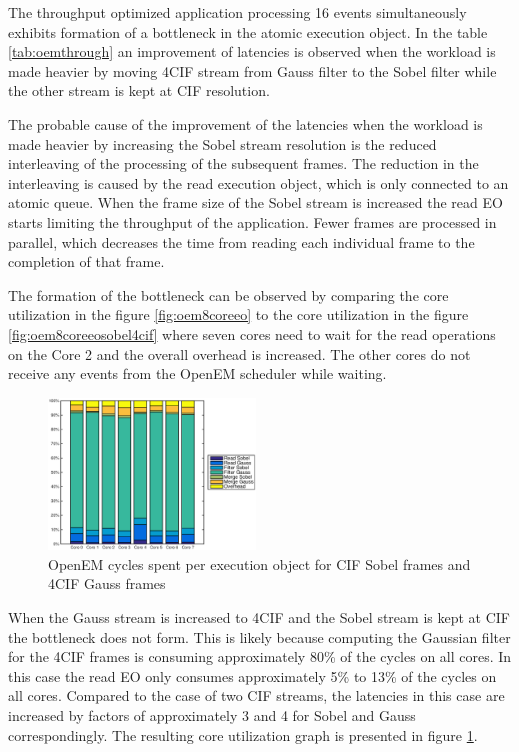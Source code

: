 The throughput optimized application processing 16 events simultaneously exhibits formation of a bottleneck in the atomic execution object. In the table \ref{tab:oemthrough} an improvement of latencies is observed when the workload is made heavier by moving 4CIF stream from Gauss filter to the Sobel filter while the other stream is kept at CIF resolution.

The probable cause of the improvement of the latencies when the workload is made heavier by increasing the Sobel stream resolution is the reduced interleaving of the processing of the subsequent frames. The reduction in the interleaving is caused by the read execution object, which is only connected to an atomic queue. When the frame size of the Sobel stream is increased the read EO starts limiting the throughput of the application. Fewer frames are processed in parallel, which decreases the time from reading each individual frame to the completion of that frame.

The formation of the bottleneck can be observed by comparing the core utilization in the figure \ref{fig:oem8coreeo} to the core utilization in the figure \ref{fig:oem8coreeosobel4cif} where seven cores need to wait for the read operations on the Core 2 and the overall overhead is increased. The other cores do not receive any events from the OpenEM scheduler while waiting.

\begin{figure}
    \begin{center}
        \includegraphics[width=0.49\textwidth]{images/openem_sobelcif_gauss4cif_eo.eps}
        \caption{OpenEM cycles spent per execution object for CIF Sobel frames
        and 4CIF Gauss frames}
        \label{fig:oem8coreeogauss4cif}
    \end{center}
\end{figure}

When the Gauss stream is increased to 4CIF and the Sobel stream is kept at CIF the bottleneck does not form. This is likely because computing the Gaussian filter for the 4CIF frames is consuming approximately 80\% of the cycles on all cores. In this case the read EO only consumes approximately 5\% to 13\% of the cycles on all cores. Compared to the case of two CIF streams, the latencies in this case are increased by factors of approximately 3 and 4 for Sobel and Gauss correspondingly. The resulting core utilization graph is presented in figure \ref{fig:oem8coreeogauss4cif}.
\FloatBarrier

